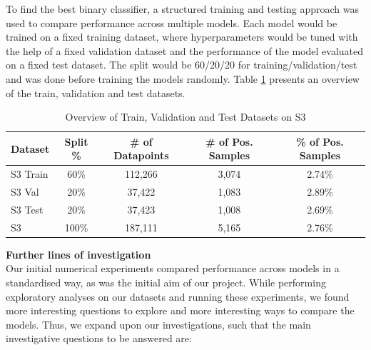 \documentclass[a4paper,11pt]{report}
\begin{document}
To find the best binary classifier, a structured training and testing approach was used to compare performance across multiple models. Each model would be trained on a fixed training dataset, where hyperparameters would be tuned with the help of a fixed validation dataset and the performance of the model evaluated on a fixed test dataset. The split would be 60/20/20 for training/validation/test and was done before training the models randomly. Table \ref{table:train_test_val} presents an overview of the train, validation and test datasets. 

\begin{table}[H]
        \caption{Overview of Train, Validation and Test Datasets on S3}
        \label{table:train_test_val}
        \centering
        \begin{tabular}{lcccc}
        \toprule
        \textbf{Dataset} & \textbf{Split \%} & \textbf{\# of Datapoints} &  \textbf{\# of Pos. Samples} & \textbf{\% of Pos. Samples} \\
        \toprule
        S3 Train & 60\% & 112,266  & 3,074 & 2.74\% \\
        S3 Val & 20\% & 37,422 & 1,083 & 2.89\% \\ 
        S3 Test & 20\% & 37,423 & 1,008 & 2.69\% \\ \midrule
        S3 & 100\% & 187,111 & 5,165 & 2.76\% \\ \bottomrule
        \end{tabular}
\end{table}

\noindent \textbf{Further lines of investigation} \\
Our initial numerical experiments compared performance across models in a standardised way, as was the initial aim of our project. While performing exploratory analyses on our datasets and running these experiments, we found more interesting questions to explore and more interesting ways to compare the models. Thus, we expand upon our investigations, such that the main investigative questions to be answered are: 
\end{document}
